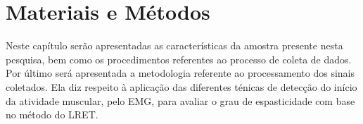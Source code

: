 
\chapter{Materiais e Métodos}
\label{cap:metodologia}
Neste capítulo serão apresentadas as características da amostra presente nesta pesquisa, bem como os procedimentos referentes ao processo de coleta de dados. Por último será apresentada a metodologia referente ao processamento dos sinais coletados. Ela diz respeito à aplicação das diferentes ténicas de detecção do início da atividade muscular, pelo EMG, para avaliar o grau de espasticidade com base no método do LRET.
